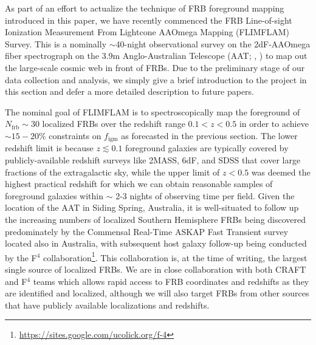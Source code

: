 \documentclass[twocolumn]{aastex63}
\newcommand{\figm}{\ensuremath{f_\mathrm{igm}}}
\newcommand{\nfrb}{\ensuremath{N_\mathrm{frb}}}
\begin{document}
\begin{CJK*}{UTF8}{gbsn}
As part of an effort to actualize the technique of FRB foreground mapping introduced in this paper, 
we have recently commenced the FRB Line-of-sight Ionization Measurement From Lightcone AAOmega Mapping (FLIMFLAM) Survey.
This is a nominally $\sim$40-night observational survey on the 2dF-AAOmega fiber spectrograph on the 3.9m Anglo-Australian Telescope (AAT; \citealt{lewis:2002}, \citealt{sharp:2006}) to map out the large-scale cosmic web in front of FRBs. 
Due to the preliminary stage of our data collection and analysis,
we simply give a brief introduction to the project in this section and defer a more detailed description to future papers.

The nominal goal of FLIMFLAM is to spectroscopically map the foreground of $\nfrb \sim 30$ localized FRBs over the redshift range
 $0.1<z<0.5$ in order to achieve
$\sim 15-20\%$ constraints on \figm{} as forecasted in the previous section. The lower redshift limit is because $z\lesssim 0.1$ foreground galaxies are typically covered by publicly-available redshift surveys like 2MASS, 6dF, and SDSS that cover large fractions of the extragalactic sky, 
while the upper limit of $z<0.5$ was deemed the 
highest practical redshift for which we can obtain reasonable samples of foreground galaxies within $\sim$ 2-3 nights of observing time
per field. Given the location of the AAT in Siding Spring, Australia, it is well-situated to follow up the increasing numbers of 
localized Southern Hemisphere FRBs 
being discovered predominately by the Commensal Real-Time
ASKAP Fast Transient \citep[CRAFT,][]{shannon:2018} survey located also in Australia, 
with subsequent host galaxy follow-up being conducted by the F$^4$ collaboration\footnote{\url{https://sites.google.com/ucolick.org/f-4}}.
{This collaboration is, at the time of writing, the largest single source of localized FRBs.}
We are in close collaboration with both CRAFT and F$^4$ teams which allows rapid access to FRB coordinates and redshifts 
as they are identified and localized,
although we will also target FRBs from other sources that have publicly available localizations and redshifts.


\end{CJK*}
\end{document}

